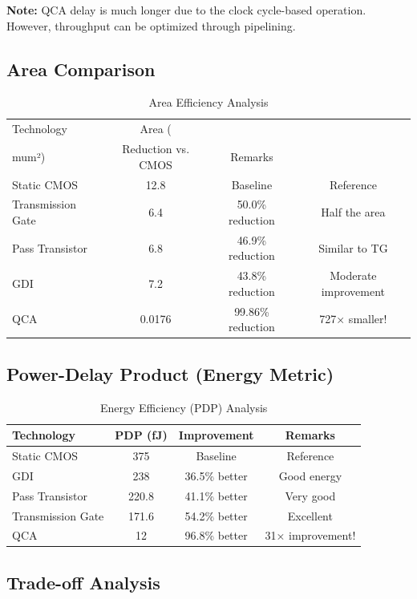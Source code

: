 \documentclass[12pt,a4paper,twoside]{report}
\begin{document}
\textbf{Note:} QCA delay is much longer due to the clock cycle-based operation. However, throughput can be optimized through pipelining.

\subsection{Area Comparison}

\begin{table}[H]
\centering
\caption{Area Efficiency Analysis}
\label{tab:area_analysis}
\begin{tabularx}{\textwidth}{lccc}
\toprule
Technology & Area (\\mum²) & Reduction vs. CMOS & Remarks \\
\midrule
Static CMOS & 12.8 & Baseline & Reference \\
Transmission Gate & 6.4 & 50.0\% reduction & Half the area \\
Pass Transistor & 6.8 & 46.9\% reduction & Similar to TG \\
GDI & 7.2 & 43.8\% reduction & Moderate improvement \\
QCA & 0.0176 & 99.86\% reduction & 727× smaller! \\
\bottomrule
\end{tabularx}
\end{table}

\subsection{Power-Delay Product (Energy Metric)}

\begin{table}[H]
\centering
\caption{Energy Efficiency (PDP) Analysis}
\label{tab:pdp_analysis}
\begin{tabularx}{\textwidth}{lccc}
\toprule
Technology & PDP (fJ) & Improvement & Remarks \\
\midrule
Static CMOS & 375 & Baseline & Reference \\
GDI & 238 & 36.5\% better & Good energy \\
Pass Transistor & 220.8 & 41.1\% better & Very good \\
Transmission Gate & 171.6 & 54.2\% better & Excellent \\
QCA & 12 & 96.8\% better & 31× improvement! \\
\bottomrule
\end{tabularx}
\end{table}

\subsection{Trade-off Analysis}
\end{document}
